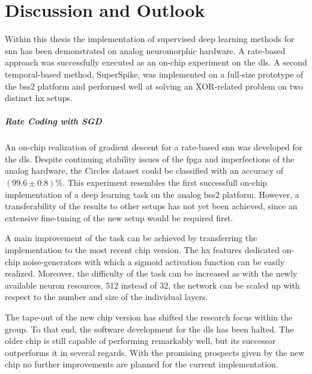 \chapter{Discussion and Outlook}
\label{discussionandoutlook}
Within this thesis the implementation of supervised deep learning methods for \gls{snn} has been demonstrated on analog neuromorphic hardware. A rate-based approach was successfully executed as an on-chip experiment on the \gls{dls}. A second temporal-based method, SuperSpike, was implemented on a full-size prototype of the \gls{bss2} platform and performed well at solving an XOR-related problem on two distinct \gls{hx} setups.

\paragraph{Rate Coding with SGD} An on-chip realization of gradient descent for a rate-based \gls{snn} was developed for the \gls{dls}. Despite continuing stability issues of the \gls{fpga} and imperfections of the analog hardware, the Circles dataset could be classified with an accuracy of $(99.6 \pm 0.8) \%$. This experiment resembles the first successfull on-chip implementation of a deep learning task on the analog \gls{bss2} platform. However, a transferability of the results to other setups has not yet been achieved, since an extensive fine-tuning of the new setup would be required first.

A main improvement of the task can be achieved by transferring the implementation to the most recent chip version. The \gls{hx} features dedicated on-chip noise-generators with which a sigmoid activation function can be easily realized. Moreover, the difficulty of the task can be increased as with the newly available neuron resources, 512 instead of 32, the network can be scaled up with respect to the number and size of the individual layers.

The tape-out of the new chip version has shifted the research focus within the group. To that end, the software development for the \gls{dls} has been halted. The older chip is still capable of performing remarkably well, but its successor outperforms it in several regards. With the promising prospects given by the new chip no further improvements are planned for the current implementation.

